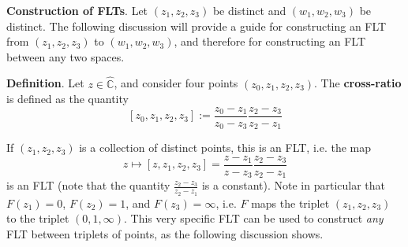 \begin{shaded}
    \textbf{Construction of FLTs}. Let $(z_1,z_2,z_3)$ be distinct and $(w_1,w_2,w_3)$ be distinct. The following discussion will provide a guide for constructing an FLT from $(z_1,z_2,z_3)$ to $(w_1,w_2,w_3)$, and therefore for constructing an FLT between any two spaces.

    \textbf{Definition}. Let $z\in \hat{\mathbb{C}}$, and consider four points $(z_0,z_1,z_2,z_3)$. The \textbf{cross-ratio} is defined as the quantity \[[z_0,z_1,z_2,z_3] := \frac{z_0-z_1}{z_0-z_3} \frac{z_2-z_3}{z_2-z_1}\]

    If $(z_1,z_2,z_3)$ is a collection of distinct points, this is an FLT, i.e. the map \[z\mapsto [z,z_1,z_2,z_3] = \frac{z-z_1}{z-z_3} \frac{z_2-z_3}{z_2-z_1}\] is an FLT (note that the quantity $\frac{z_2-z_3}{z_2-z_1}$ is a constant). Note in particular that $F(z_1) = 0$, $F(z_2) = 1$, and $F(z_3)=\infty$, i.e. $F$ maps the triplet $(z_1,z_2,z_3)$ to the triplet $(0,1,\infty)$. This very specific FLT can be used to construct \textit{any} FLT between triplets of points, as the following discussion shows.


\end{shaded}
